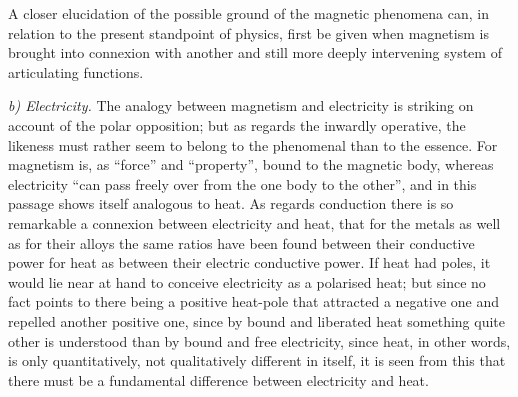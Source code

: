 \documentclass[12pt,a4paper]{book}
\newcommand{\runin}[1]{\emph{#1}\hspace{0.4em}}
\begin{document}
A closer elucidation of the possible ground of the magnetic phenomena can, in relation to the present standpoint of
physics, first be given when magnetism is brought into
connexion with another and still more deeply intervening system of articulating functions.

\runin{b) Electricity.} The analogy between magnetism and electricity is striking on account of the polar opposition; but
as regards the inwardly operative, the likeness must rather seem to belong to the phenomenal than to the essence. For
magnetism is, as ``force'' and ``property'', bound to the magnetic body, whereas electricity ``can pass freely over from
the one body to the other'', and in this passage shows itself analogous to heat. As regards conduction there is so
remarkable a connexion between electricity and heat, that for the metals as well as for their alloys the same ratios have
been found between their conductive power for heat as between their electric conductive power. If heat had poles, it
would lie near at hand to conceive electricity as a polarised heat; but since no fact points to there being a positive
heat-pole that attracted a negative one and repelled another positive one, since by bound and liberated heat something
quite other is understood than by bound and free electricity, since heat, in other words, is only quantitatively, not
qualitatively different in itself, it is seen from this that there must be a fundamental difference between electricity
and heat.
\end{document}
